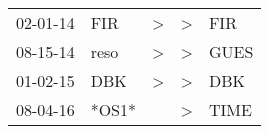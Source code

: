 \begin{supertabular}{lllll}
 02-01-14 &    FIR &  \textgreater &  \textgreater &   FIR \\
 08-15-14 &   reso &  \textgreater &  \textgreater &  GUES \\
 01-02-15 &    DBK &  \textgreater &  \textgreater &   DBK \\
 08-04-16 &  *OS1* &               &  \textgreater &  TIME \\
\end{supertabular}
